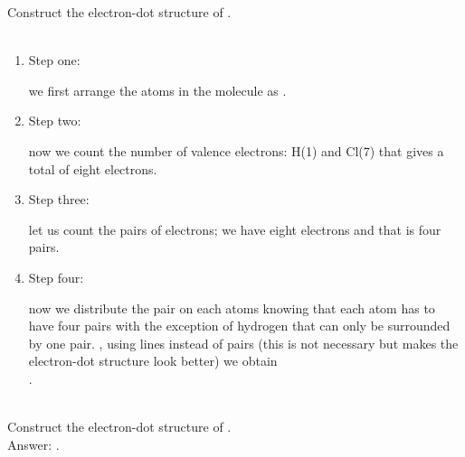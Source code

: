 \documentclass[main.tex]{subfiles}
\begin{document}
\begin{description}
\begin{example} %
Construct the electron-dot structure of .\\
\\
\begin{enumerate}[label=\protect\circled{\color{white}\arabic*}]
\item \begin{bf}Step one:\end{bf} we first arrange the atoms in the molecule as \hspace{.05in}. 
\item \begin{bf}Step two:\end{bf} now we count the number of valence electrons: H(1) and Cl(7) that gives a total of eight electrons.
 \item \begin{bf}Step three:\end{bf} let us count the pairs of electrons; we have eight electrons and that is four pairs.
\item \begin{bf}Step four:\end{bf} now we distribute the pair on each atoms knowing that each atom has to have four pairs with the exception of hydrogen that can only be surrounded by one pair.
\hspace{.05in}\hspace{.05in}, using lines instead of pairs (this is not necessary but makes the electron-dot structure look better) we obtain\\
 \hspace{.05in}.
\end{enumerate}
\faDiamond\ \\
Construct the electron-dot structure of .\\
\flushright Answer: \hspace{.05in}.
\end{example}%


\end{description}
\end{document}
